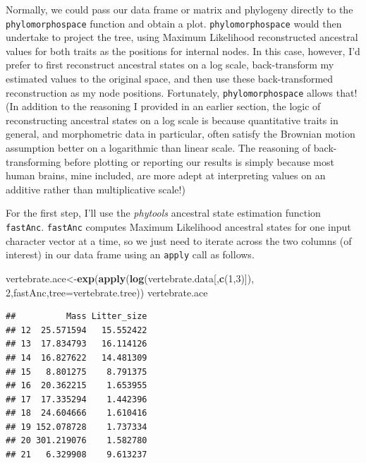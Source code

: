 \documentclass[fleqn,10pt,lineno]{wlpeerj} %
\newenvironment{Shaded}{\begin{snugshade}}{\end{snugshade}}
\newcommand{\AttributeTok}[1]{\textcolor[rgb]{0.13,0.29,0.53}{#1}}
\newcommand{\DecValTok}[1]{\textcolor[rgb]{0.00,0.00,0.81}{#1}}
\newcommand{\FunctionTok}[1]{\textcolor[rgb]{0.13,0.29,0.53}{\textbf{#1}}}
\newcommand{\NormalTok}[1]{#1}
\newcommand{\OtherTok}[1]{\textcolor[rgb]{0.56,0.35,0.01}{#1}}
\begin{document}
Normally, we could pass our data frame or matrix and phylogeny directly to the \texttt{phylomorphospace} function and obtain a plot. \texttt{phylomorphospace} would then undertake to project the tree, using Maximum Likelihood reconstructed ancestral values for both traits as the positions for internal nodes. In this case, however, I'd prefer to first reconstruct ancestral states on a log scale, back-transform my estimated values to the original space, and then use these back-transformed reconstruction as my node positions. Fortunately, \texttt{phylomorphospace} allows that! (In addition to the reasoning I provided in an earlier section, the logic of reconstructing ancestral states on a log scale is because quantitative traits in general, and morphometric data in particular, often satisfy the Brownian motion assumption better on a logarithmic than linear scale. The reasoning of back-transforming before plotting or reporting our results is simply because most human brains, mine included, are more adept at interpreting values on an additive rather than multiplicative scale!)

For the first step, I'll use the \emph{phytools} ancestral state estimation function \texttt{fastAnc}. \texttt{fastAnc} computes Maximum Likelihood ancestral states for one input character vector at a time, so we just need to iterate across the two columns (of interest) in our data frame using an \texttt{apply} call as follows.

\begin{Shaded}
\begin{Highlighting}[]
\NormalTok{vertebrate.ace}\OtherTok{\textless{}{-}}\FunctionTok{exp}\NormalTok{(}\FunctionTok{apply}\NormalTok{(}\FunctionTok{log}\NormalTok{(vertebrate.data[,}\FunctionTok{c}\NormalTok{(}\DecValTok{1}\NormalTok{,}\DecValTok{3}\NormalTok{)]),}
  \DecValTok{2}\NormalTok{,fastAnc,}\AttributeTok{tree=}\NormalTok{vertebrate.tree))}
\NormalTok{vertebrate.ace}
\end{Highlighting}
\end{Shaded}

\begin{verbatim}
##          Mass Litter_size
## 12  25.571594   15.552422
## 13  17.834793   16.114126
## 14  16.827622   14.481309
## 15   8.801275    8.791375
## 16  20.362215    1.653955
## 17  17.335294    1.442396
## 18  24.604666    1.610416
## 19 152.078728    1.737334
## 20 301.219076    1.582780
## 21   6.329908    9.613237
\end{verbatim}
\end{document}
